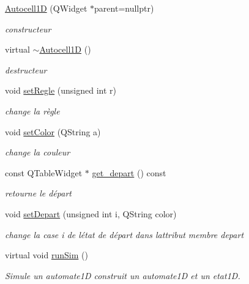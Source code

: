 \begin{DoxyCompactItemize}
\item 
\hyperlink{class_autocell1_d_a4a706f162ed7e0b81f55a3463e355c9c}{Autocell1D} (Q\+Widget $\ast$parent=nullptr)
\begin{DoxyCompactList}\small\item\em constructeur \end{DoxyCompactList}\item 
virtual \hyperlink{class_autocell1_d_a6e0394ef052472c6e23dd1bdd4c3dcd2}{$\sim$\+Autocell1D} ()
\begin{DoxyCompactList}\small\item\em destructeur \end{DoxyCompactList}\item 
void \hyperlink{class_autocell1_d_a9591755409ac74ff5564d86af4236a28}{set\+Regle} (unsigned int r)
\begin{DoxyCompactList}\small\item\em change la règle \end{DoxyCompactList}\item 
void \hyperlink{class_autocell1_d_a624d426584e5dbc621416118f09ac528}{set\+Color} (Q\+String a)
\begin{DoxyCompactList}\small\item\em change la couleur \end{DoxyCompactList}\item 
const Q\+Table\+Widget $\ast$ \hyperlink{class_autocell1_d_af724076ad7bd4f512174d63394c89aba}{get\+\_\+depart} () const 
\begin{DoxyCompactList}\small\item\em retourne le départ \end{DoxyCompactList}\item 
void \hyperlink{class_autocell1_d_a4e7c5c216925849a0ba80ea94272b63e}{set\+Depart} (unsigned int i, Q\+String color)
\begin{DoxyCompactList}\small\item\em change la case i de l\textquotesingle{}état de départ dans l\textquotesingle{}attribut membre depart \end{DoxyCompactList}\item 
virtual void \hyperlink{class_autocell1_d_a4793eae53adcca32290621c45a76260c}{run\+Sim} ()
\begin{DoxyCompactList}\small\item\em Simule un automate1D construit un automate1D et un etat1D. \end{DoxyCompactList}\item 

\end{DoxyCompactItemize}
